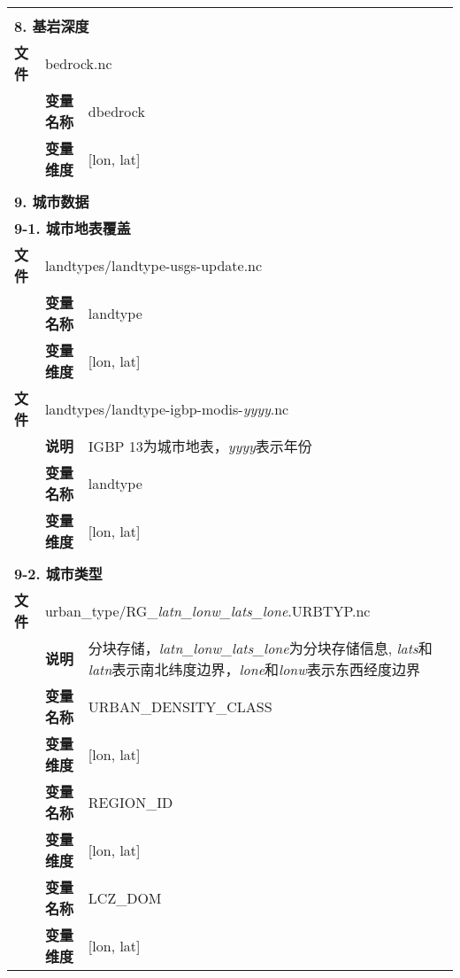 {\begin{longtable}{llp{}}
\midrule
\vspace{2\baselineskip}\\
 \multicolumn{3}{l}{\textbf{8. 基岩深度}} \\
\cline{1-3}
\textbf{文件} & \multicolumn{2}{l}{bedrock.nc} \\
\cline{2-3}
& \textbf{变量名称} & dbedrock \\
& \textbf{变量维度} & {[}lon, lat{]} \\

\midrule
\vspace{2\baselineskip}\\
\multicolumn{3}{l}{\textbf{9. 城市数据}} \\
\multicolumn{3}{l}{\textbf{9-1. 城市地表覆盖}} \\
\cline{1-3}
\textbf{文件} & \multicolumn{2}{l}{landtypes/landtype-usgs-update.nc} \\
\cline{2-3}
& \textbf{变量名称} & landtype \\
& \textbf{变量维度} & {[}lon, lat{]} \\
\cline{1-3}
\textbf{文件} & \multicolumn{2}{l}{landtypes/landtype-igbp-modis-\textit{yyyy}.nc}
\\
& \textbf{说明} & IGBP 13为城市地表，\textit{yyyy}表示年份 \\
\cline{2-3}
& \textbf{变量名称} & landtype \\
& \textbf{变量维度} & {[}lon, lat{]} \\

\midrule
\vspace{2\baselineskip}\\
\multicolumn{3}{l}{\textbf{9-2. 城市类型}} \\
\cline{1-3}
\textbf{文件} & \multicolumn{2}{l}{urban\_type/RG\_\textit{latn\_lonw\_lats\_lone}.URBTYP.nc} \\
& \textbf{说明} & 分块存储，\textit{latn\_lonw\_lats\_lone}为分块存储信息, \textit{lats}和\textit{latn}表示南北纬度边界，\textit{lone}和\textit{lonw}表示东西经度边界 \\
\cline{2-3}
& \textbf{变量名称} & URBAN\_DENSITY\_CLASS \\
& \textbf{变量维度} & {[}lon, lat{]} \\
\cline{2-3}
& \textbf{变量名称} & REGION\_ID \\
& \textbf{变量维度} & {[}lon, lat{]} \\
\cline{2-3}
& \textbf{变量名称} & LCZ\_DOM \\
& \textbf{变量维度} & {[}lon, lat{]} \\


\end{longtable}}
